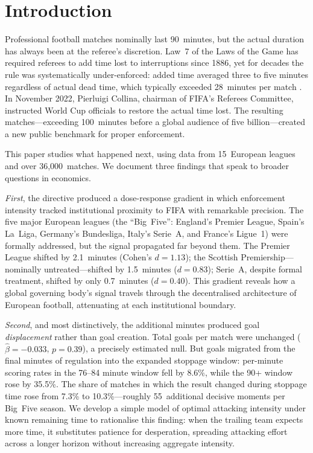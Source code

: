 
\section{Introduction}
\label{sec:intro}

Professional football matches nominally last 90~minutes, but the actual
duration has always been at the referee's discretion. Law~7 of the Laws
of the Game has required referees to add time lost to interruptions
since 1886, yet for decades the rule was systematically under-enforced:
added time averaged three to five minutes regardless of actual dead
time, which typically exceeded 28~minutes per match
\citep{forcher2024additional}. In November 2022, Pierluigi Collina,
chairman of FIFA's Referees Committee, instructed World Cup officials
to restore the actual time lost. The resulting matches---exceeding
100~minutes before a global audience of five billion---created a new
public benchmark for proper enforcement.

This paper studies what happened next, using data from 15~European
leagues and over 36,000~matches. We document three findings that
speak to broader questions in economics.

\textit{First}, the directive produced a dose-response gradient in
which enforcement intensity tracked institutional proximity to FIFA
with remarkable precision. The five major European leagues (the
``Big~Five'': England's Premier League, Spain's La~Liga, Germany's
Bundesliga, Italy's Serie~A, and France's Ligue~1) were formally
addressed, but the signal propagated far beyond them. The Premier
League shifted by 2.1~minutes (Cohen's $d = 1.13$); the Scottish
Premiership---nominally untreated---shifted by 1.5~minutes
($d = 0.83$); Serie~A, despite formal treatment, shifted by only
0.7~minutes ($d = 0.40$). This gradient reveals how a global
governing body's signal travels through the decentralised architecture
of European football, attenuating at each institutional boundary.

\textit{Second}, and most distinctively, the additional minutes
produced goal \textit{displacement} rather than goal creation. Total
goals per match were unchanged ($\hat{\beta} = -0.033$, $p = 0.39$),
a precisely estimated null. But goals migrated from the final minutes
of regulation into the expanded stoppage window: per-minute scoring
rates in the 76--84 minute window fell by 8.6\%, while the 90+ window
rose by 35.5\%. The share of matches in which the result changed
during stoppage time rose from 7.3\% to 10.3\%---roughly 55~additional
decisive moments per Big~Five season. We develop a simple model of
optimal attacking intensity under known remaining time to rationalise
this finding: when the trailing team expects more time, it substitutes
patience for desperation, spreading attacking effort across a longer
horizon without increasing aggregate intensity.

